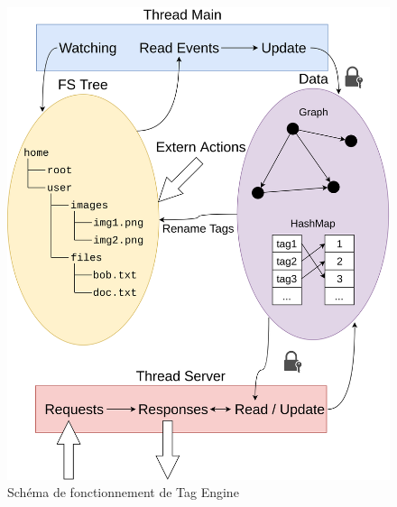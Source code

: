 \begin{figure}
    \begin{center}
        \includegraphics[width=1\textwidth]{images/tag_engine.png}
    \end{center}
    \caption{Schéma de fonctionnement de Tag Engine}
    \label{tag_engine_schema}
\end{figure}

\newpage
